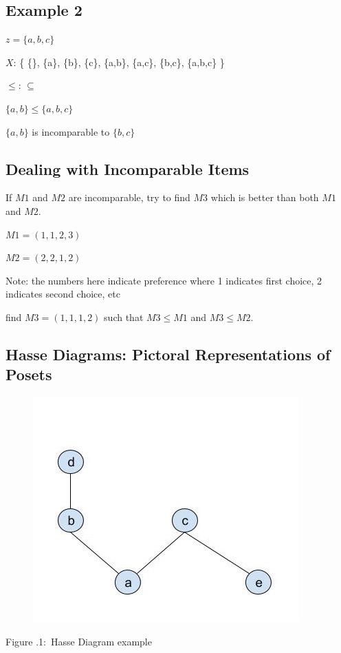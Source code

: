 \documentclass[twoside]{article}
\newcounter{lecnum}
\newcommand{\fig}[3]{
			\vspace{#2}
			\begin{center}
			Figure \thelecnum.#1:~#3
			\end{center}
	}
\begin{document}
\vspace{3mm} %

\subsection{Example 2}
$z = \{a, b, c\}$

$X$: \{ \{\}, \{a\}, \{b\}, \{c\}, \{a,b\}, \{a,c\}, \{b,c\}, \{a,b,c\} \}

$\leq$: $\subseteq$
\newline

$\{a,b\} \leq \{a,b,c\}$

$\{a,b\}$ is incomparable to $\{b,c\}$

\subsection{Dealing with Incomparable Items}
If $M1$ and $M2$ are incomparable, try to find $M3$ which is better than both $M1$ and $M2$.
\newline

$M1 = (1,1,2,3)$

$M2 = (2,2,1,2)$

Note: the numbers here indicate preference where 1 indicates first choice, 2 indicates second choice, etc
\newline

find $M3 = (1,1,1,2)$ such that $M3 \leq M1$ and $M3 \leq M2$.

\subsection{Hasse Diagrams: Pictoral Representations of Posets}
\begin{figure}[h]
\centering
\includegraphics[width=.8\textwidth]{hasse.jpg}
\end{figure}
\fig{1}{0cm}{Hasse Diagram example}
\end{document}

